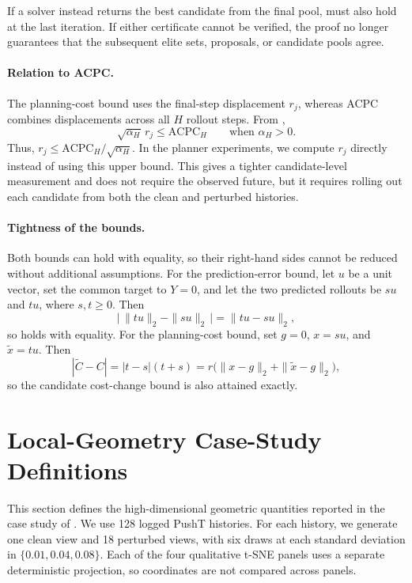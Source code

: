 \documentclass[10pt]{article}
\begin{document}
If a solver instead returns the best candidate from the final pool,
 must also hold at the last iteration. If either
certificate cannot be verified, the proof no longer guarantees that the
subsequent elite sets, proposals, or candidate pools agree.

\paragraph{Relation to ACPC.}
The planning-cost bound uses the final-step displacement $r_j$, whereas ACPC
combines displacements across all $H$ rollout steps. From ,
\[
\sqrt{\alpha_H}\,r_j
\leq \mathrm{ACPC}_H
\qquad\text{when }\alpha_H>0.
\]
Thus, $r_j\leq\mathrm{ACPC}_H/\sqrt{\alpha_H}$. In the planner experiments, we
compute $r_j$ directly instead of using this upper bound. This gives a tighter
candidate-level measurement and does not require the observed future, but it
requires rolling out each candidate from both the clean and perturbed
histories.

\paragraph{Tightness of the bounds.}
Both bounds can hold with equality, so their right-hand sides cannot be
reduced without additional assumptions. For the prediction-error bound, let
$u$ be a unit vector, set the common target to $Y=0$, and let the two predicted
rollouts be $su$ and $tu$, where $s,t\geq0$. Then
\[
\bigl|\,\|tu\|_2-\|su\|_2\,\bigr|
=\|tu-su\|_2,
\]
so  holds with equality. For the planning-cost
bound, set $g=0$, $x=su$, and $\tilde x=tu$. Then
\[
|\tilde C-C|
=|t-s|(t+s)
=r\bigl(\|x-g\|_2+\|\tilde x-g\|_2\bigr),
\]
so the candidate cost-change bound is also attained exactly.

\section{Local-Geometry Case-Study Definitions}
\label{sec:appendix-local-geometry}

This section defines the high-dimensional geometric quantities reported in the
case study of . We use 128 logged PushT histories.
For each history, we generate one clean view and 18 perturbed views, with six
draws at each standard deviation in $\{0.01,0.04,0.08\}$. Each of the four
qualitative t-SNE panels uses a separate deterministic projection, so
coordinates are not compared across panels.
\end{document}
